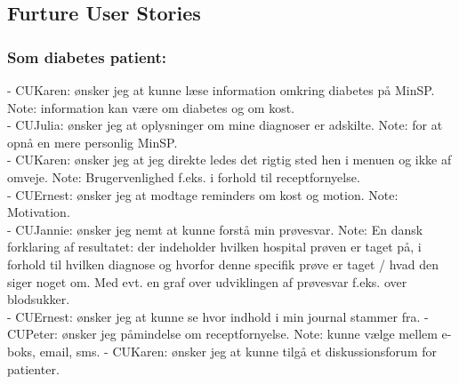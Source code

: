 \subsection{Furture User Stories}
\subsubsection{Som diabetes patient:}
- CUKaren: ønsker jeg at kunne læse information omkring diabetes på MinSP. Note: information kan være om diabetes og om kost.\\
- CUJulia: ønsker jeg at oplysninger om mine diagnoser er adskilte. Note: for at opnå en mere personlig MinSP.\\
- CUKaren: ønsker jeg at jeg direkte ledes det rigtig sted hen i menuen og ikke af omveje. Note: Brugervenlighed f.eks. i forhold til receptfornyelse.\\ 
- CUErnest: ønsker jeg at modtage reminders om kost og motion. Note: Motivation. \\
- CUJannie: ønsker jeg nemt at kunne forstå min prøvesvar. Note: En dansk forklaring af resultatet: der indeholder hvilken hospital prøven er taget på, i forhold til hvilken diagnose og hvorfor denne specifik prøve er taget / hvad den siger noget om. Med evt. en graf over udviklingen af prøvesvar f.eks. over blodsukker.\\
- CUErnest: ønsker jeg at kunne se hvor indhold i min journal stammer fra.
- CUPeter: ønsker jeg påmindelse om receptfornyelse. Note: kunne vælge mellem e-boks, email, sms.
- CUKaren: ønsker jeg at kunne tilgå et diskussionsforum for patienter.\\
%
